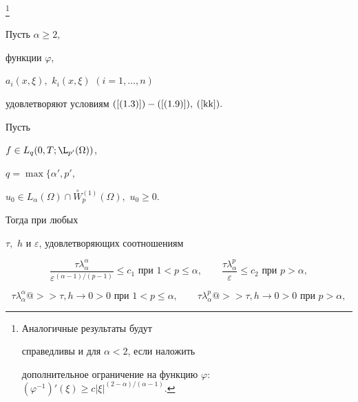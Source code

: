 \begin{thmm}\label{t5.1}%


\footnote[1]{Аналогичные результаты будут


справедливы и для  $\alpha < 2$, если наложить


дополнительное ограничение на функцию $\varphi:$ $(\varphi^{-1})'


(\xi) \ge c|\xi |^{(2-\alpha)/(\alpha-1)}$. }


Пусть $\alpha \ge 2,$


функции $\varphi$,


$ a_{i}(x,\xi), $  $ k_{i}(x,\xi )$ $ ( i = 1,\dotsc,n ) $


удовлетворяют условиям $(\ref{(1.3)})-(\ref{(1.9)}),$ $(\ref{kk}).$


Пусть




$f\in L_q(0,T;\L_{p'}(\Omega))$,


$q=\max\{\alpha',p'$,


$u_{0} \in L_{\alpha }( \Omega ) \cap


\overset \circ W{}^{(1)}_{p}( \Omega ),$ $u_{0} \ge 0 $.


Тогда при любых


$\tau,$ $h$ и $\varepsilon$, удовлетворяющих соотношениям


%


\begin{equation}


\frac{\tau \lambda^{\alpha}_\alpha}{\varepsilon^{(\alpha-1)/(p-1)}}


\le c_1 \text{ при } 1<p\le\alpha, \qquad


\frac{\tau\lambda^p_\alpha}{\varepsilon}\le c_2


\text{ при } p>\alpha,


\label{5.7}


\end{equation}


%


\begin{equation}


\tau\lambda^{\alpha}_\alpha @>>{\tau,h\to 0}> 0 \text{ при }1<p\le\alpha,


\qquad


\tau\lambda^p_\alpha @>>{\tau,h\to 0}> 0 \text{ при }p>\alpha,


\label{nu}


\end{equation}



\end{thmm}
